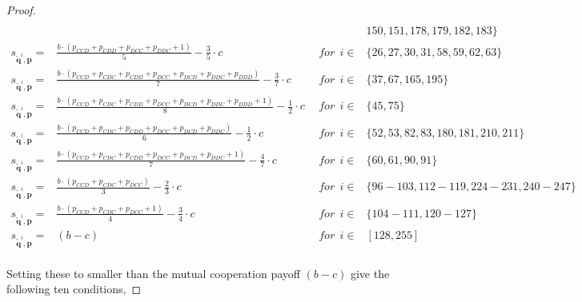 \documentclass{article}
\theoremstyle{definition}
\begin{document}
\begin{proof}
{\begin{equation}
\begin{array}{lcll}
    \\ & & &  150, 151, 178, 179, 182, 183\} \\ 
    s_{\mathbf{\tilde{q}}^{i}, \mathbf{p}} = & \frac{b \cdot \left(p_{CCD} + p_{CDD} + p_{DCC} + p_{DDC} + 1\right)}{5} - \frac{3}{5} \cdot c & ~~for~~ i \in & \{ 26, 27, 30, 31, 58, 59, 62, 63\} \\ [0.2cm]
    s_{\mathbf{\tilde{q}}^{i}, \mathbf{p}} = & \frac{b \cdot \left(p_{CCD} + p_{CDC} + p_{CDD} + p_{DCC} + p_{DCD} + p_{DDC} + p_{DDD}\right)}{7}  - \frac{3}{7} \cdot c& ~~for~~ i \in & \{ 37, 67, 165, 195\} \\ [0.2cm]
    s_{\mathbf{\tilde{q}}^{i}, \mathbf{p}} = & \frac{b \cdot \left(p_{CCD} + p_{CDC} + p_{CDD} + p_{DCC} + p_{DCD} + p_{DDC} + p_{DDD} + 1\right)}{8} - \frac{1}{2} \cdot c & ~~for~~ i \in & \{ 45, 75\} \\ [0.2cm]
    s_{\mathbf{\tilde{q}}^{i}, \mathbf{p}} = & \frac{b \cdot \left(p_{CCD} + p_{CDC} + p_{CDD} + p_{DCC} + p_{DCD} + p_{DDC}\right)}{6} - \frac{1}{2} \cdot c & ~~for~~ i \in & \{ 52, 53, 82, 83, 180, 181, 210, 211\} \\  [0.2cm]
    s_{\mathbf{\tilde{q}}^{i}, \mathbf{p}} = & \frac{b \cdot \left(p_{CCD} + p_{CDC} + p_{CDD} + p_{DCC} + p_{DCD} + p_{DDC} + 1\right)}{7} - \frac{4}{7} \cdot c & ~~for~~ i \in & \{ 60, 61, 90, 91\} \\ [0.2cm]
    s_{\mathbf{\tilde{q}}^{i}, \mathbf{p}} = & \frac{b \cdot \left(p_{CCD} + p_{CDC} + p_{DCC}\right)}{3} - \frac{2}{3} \cdot c & ~~for~~ i \in & \{ 96\!- \!103, 112\!- \!119, 224\!- \!231, 240\!- \!247\} \\ [0.2cm]
    s_{\mathbf{\tilde{q}}^{i}, \mathbf{p}} = & \frac{b \cdot \left(p_{CCD} + p_{CDC} + p_{DCC} + 1\right)}{4} - \frac{3}{4} \cdot c & ~~for~~ i \in & \{ 104\!-\!111, 120\!- \!127\} \\ [0.2cm]
    s_{\mathbf{\tilde{q}}^{i}, \mathbf{p}} = & (b - c) & ~~for~~ i \in & [128, 255] \\
\end{array}
\end{equation}}

Setting these to smaller than the mutual cooperation payoff $(b - c)$ give the
following ten conditions,


\end{proof}
\end{document}
